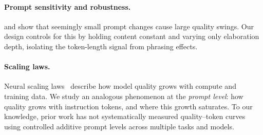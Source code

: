 \paragraph{Prompt sensitivity and robustness.}
\citet{webson2022prompt} and \citet{mizrahi2024state} show that seemingly
small prompt changes cause large quality swings.
Our design controls for this by holding content constant and varying only
elaboration depth, isolating the token-length signal from phrasing effects.

\paragraph{Scaling laws.}
Neural scaling laws~\citep{kaplan2020scaling,hoffmann2022chinchilla} describe
how model quality grows with compute and training data.
We study an analogous phenomenon at the \emph{prompt level}: how quality
grows with instruction tokens, and where this growth saturates.
To our knowledge, prior work has not systematically measured quality--token
curves using controlled additive prompt levels across multiple tasks and models.
